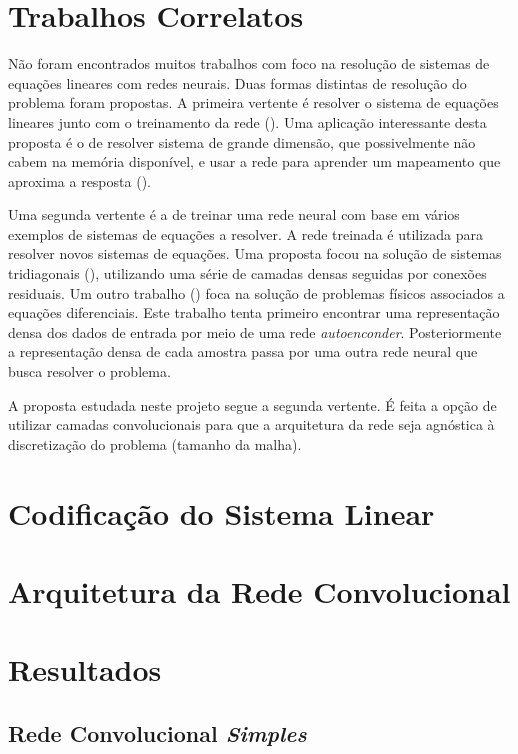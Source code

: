 \documentclass[final,5p]{elsarticle}
\numberwithin{equation}{section}
\begin{document}
\section{Trabalhos Correlatos}

    Não foram encontrados muitos trabalhos com foco na resolução de sistemas de equações lineares com redes neurais. Duas formas distintas de resolução do problema foram propostas. A primeira vertente é resolver o sistema de equações lineares junto com o treinamento da rede (\cite{cichocki1992neural}). Uma aplicação interessante desta proposta é o de resolver sistema de grande dimensão, que possivelmente não cabem na memória disponível, e usar a rede para aprender um mapeamento que aproxima a resposta (\cite{gu2023deep}).

    Uma segunda vertente é a de treinar uma rede neural com base em vários exemplos de sistemas de equações a resolver. A rede treinada é utilizada para resolver novos sistemas de equações. Uma proposta focou na solução de sistemas tridiagonais (\cite{jiang2023neural}), utilizando uma série de camadas densas seguidas por conexões residuais. Um outro trabalho (\cite{kontolati2024learning}) foca na solução de problemas físicos associados a equações diferenciais. Este trabalho tenta primeiro encontrar uma representação densa dos dados de entrada por meio de uma rede \emph{autoenconder}. Posteriormente a representação densa de cada amostra passa por uma outra rede neural que busca resolver o problema.

    A proposta estudada neste projeto segue a segunda vertente. É feita a opção de utilizar camadas convolucionais para que a arquitetura da rede seja agnóstica à discretização do problema (tamanho da malha).

\section{Codificação do Sistema Linear}


\section{Arquitetura da Rede Convolucional}


\section{Resultados}



    \subsection{Rede Convolucional \emph{Simples}}
\end{document}
